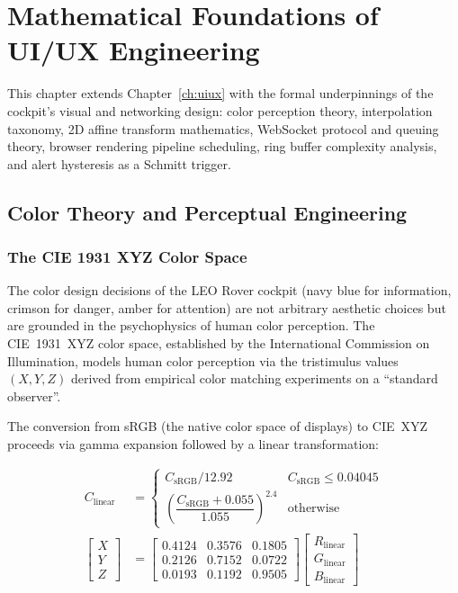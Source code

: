 \chapter{Mathematical Foundations of UI/UX Engineering}
\label{ch:uiux-math}

This chapter extends Chapter~\ref{ch:uiux} with the formal underpinnings of the cockpit's visual and networking design: color perception theory, interpolation taxonomy, 2D affine transform mathematics, WebSocket protocol and queuing theory, browser rendering pipeline scheduling, ring buffer complexity analysis, and alert hysteresis as a Schmitt trigger.

\section{Color Theory and Perceptual Engineering}

\subsection{The CIE 1931 XYZ Color Space}

The color design decisions of the LEO Rover cockpit (navy blue for information, crimson for danger, amber for attention) are not arbitrary aesthetic choices but are grounded in the psychophysics of human color perception. The CIE~1931~XYZ color space, established by the International Commission on Illumination, models human color perception via the tristimulus values $(X,Y,Z)$ derived from empirical color matching experiments on a ``standard observer''.

The conversion from sRGB (the native color space of displays) to CIE~XYZ proceeds via gamma expansion followed by a linear transformation:

\begin{eqblock}
\begin{align}
C_{\text{linear}} &= \begin{cases} C_{\text{sRGB}}/12.92 & C_{\text{sRGB}} \leq 0.04045 \\ \left(\dfrac{C_{\text{sRGB}}+0.055}{1.055}\right)^{2.4} & \text{otherwise} \end{cases} \\[6pt]
\begin{bmatrix} X\\Y\\Z \end{bmatrix} &=
\begin{bmatrix} 0.4124 & 0.3576 & 0.1805 \\ 0.2126 & 0.7152 & 0.0722 \\ 0.0193 & 0.1192 & 0.9505 \end{bmatrix}
\begin{bmatrix} R_{\text{linear}}\\G_{\text{linear}}\\B_{\text{linear}} \end{bmatrix}
\end{align}
\end{eqblock}

